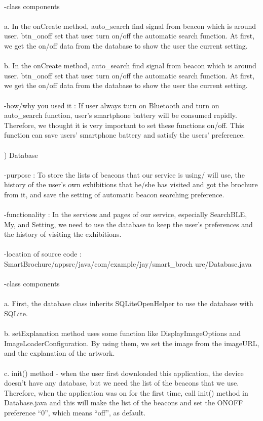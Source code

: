 \documentclass[conference]{IEEEtran}
\begin{document}
\\ -class components\\
\\ a. In the onCreate method, auto\_search find signal from beacon which is around user. btn\_onoff set that user turn on/off the automatic search function. At first, we get the on/off data from the database to show the user the current setting.\\
\\ b. In the onCreate method, auto\_search find signal from beacon which is around user. btn\_onoff set that user turn on/off the automatic search function. At first, we get the on/off data from the database to show the user the current setting.\\
\\ -how/why you used it : If user always turn on Bluetooth and turn on auto\_search function, user's smartphone battery will be consumed rapidly. Therefore, we thought it is very important to set these functions on/off. This function can save users’ smartphone battery and satisfy the users’ preference.\\\\
) Database\\\\
-purpose : To store the lists of beacons that our service is using/ will use, the history of the user’s own exhibitions that he/she has visited and got the brochure from it, and save the setting of automatic beacon searching preference.\\
\\ -functionality : In the services and pages of our service, especially SearchBLE, My, and Setting, we need to use the database to keep the user’s preferences and the history of visiting the exhibitions.\\
\\ -location of source code : SmartBrochure/appsrc/java/com/example/jay/smart\_broch
ure/Database.java\\
\\ -class components\\
\\ a. First, the database class inherits SQLiteOpenHelper to use the database with SQLite.\\
\\ b. setExplanation method uses some function like DisplayImageOptions and ImageLoaderConfiguration. By using them, we set the image from the imageURL, and the explanation of the artwork.\\
\\ c. init() method - when the user first downloaded this application, the device doesn’t have any database, but we need the list of the beacons that we use. Therefore, when the application was on for the first time, call init() method in Database.java and this will make the list of the beacons and set the ONOFF preference “0”, which means “off”, as default.\\
\end{document}
